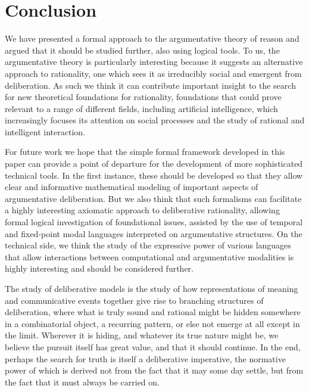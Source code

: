 \documentclass[greybox]{svmult}
\begin{document}
\section{Conclusion}\label{sec:conc}

We have presented a formal approach to the argumentative theory of reason and argued that it should be studied further, also using logical tools. To us, the argumentative theory is particularly interesting because it suggests an alternative approach to rationality, one which sees it as irreducibly social and emergent from deliberation. As such we think it can contribute important insight to the search for new theoretical foundations for rationality, foundations that could prove relevant to a range of different fields, including artificial intelligence, which increasingly focuses its attention on social processes and the study of rational and intelligent interaction.

For future work we hope that the simple formal framework developed in this paper can provide a point of departure for the development of more sophisticated technical tools. In the first instance, these should be developed so that they allow clear and informative mathematical modeling of important aspects of argumentative deliberation. But we also think that such formalisms can facilitate a highly interesting axiomatic approach to deliberative rationality,  allowing formal logical investigation of foundational issues, assisted by the use of temporal and fixed-point modal languages interpreted on argumentative structures. On the technical side, we think the study of the expressive power of various languages that allow interactions between computational and argumentative modalities is highly interesting and should be considered further. 

The study of deliberative models is the study of how representations of meaning and communicative events together give rise to branching structures of deliberation, where what is truly sound and rational might be hidden somewhere in a combinatorial object, a recurring pattern, or else not emerge at all except in the limit. Wherever it is hiding, and whatever its true nature might be, we believe the pursuit itself has great value, and that it should continue. In the end, perhaps the search for truth is itself a deliberative imperative, the normative power of which is derived not from the fact that it may some day settle, but from the fact that it must always be carried on.



\end{document}
